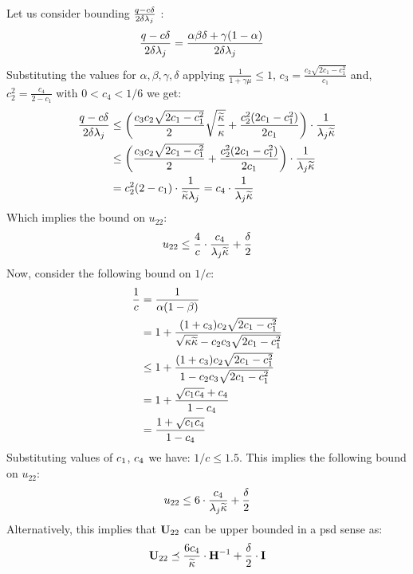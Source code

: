 Let us consider bounding $\frac{q -c\delta}{2\delta\lambda_j}$ :
\begin{align*}
\frac{q -c\delta}{2\delta\lambda_j}&=\frac{\alpha\beta\delta+\gamma(1-\alpha)}{2\delta\lambda_j}
\end{align*}
Substituting the values for $\alpha,\beta,\gamma,\delta$ applying $\frac{1}{1+\gamma\mu}\leq 1$, $c_3=\frac{c_2\sqrt{2c_1-c_1^2}}{c_1}$ and, $c_2^2=\frac{c_4}{2-c_1}$ with $0<c_4<1/6$ we get:
\begin{align*}
\frac{q -c\delta}{2\delta\lambda_j}&\leq\bigg( \frac{c_3c_2\sqrt{2c_1-c_1^2}}{2}\sqrt{\frac{\widetilde{\kappa}}{{\kappa}}} + \frac{c_2^2(2c_1-c_1^2)}{2c_1} \bigg)\cdot\frac{1}{\lambda_j\widetilde{\kappa}}\nonumber\\
&\leq\bigg( \frac{c_3c_2\sqrt{2c_1-c_1^2}}{2} + \frac{c_2^2(2c_1-c_1^2)}{2c_1} \bigg)\cdot\frac{1}{\lambda_j\widetilde{\kappa}}\nonumber\\
&=c_2^2(2-c_1)\cdot\frac{1}{\widetilde{\kappa}\lambda_j}=c_4\cdot\frac{1}{\lambda_j\widetilde{\kappa}}
\end{align*}
Which implies the bound on $u_{22}$:
\begin{align*}
u_{22}\leq\frac{4}{c}\cdot\frac{c_4}{\lambda_j\widetilde{\kappa}}+\frac{\delta}{2}
\end{align*}
Now, consider the following bound on $1/c$:
\begin{align}
\label{eq:oneOverc}
\frac{1}{c}&=\frac{1}{\alpha(1-\beta)}\nonumber\\
&=1+\frac{(1+c_3)c_2\sqrt{2c_1-c_1^2}}{\sqrt{{\kappa}\widetilde{\kappa}}-c_2c_3\sqrt{2c_1-c_1^2}}\nonumber\\
&\leq1+\frac{(1+c_3)c_2\sqrt{2c_1-c_1^2}}{1-c_2c_3\sqrt{2c_1-c_1^2}}\nonumber\\
&=1+\frac{\sqrt{c_1c_4}+c_4}{1-c_4}\nonumber\\
&=\frac{1+\sqrt{c_1c_4}}{1-c_4}
\end{align}
Substituting values of $c_1$, $c_4$ we have: $1/c\leq1.5$. This implies the following bound on $u_{22}$:
\begin{align}
\label{eq:u22b}
u_{22}\leq6\cdot\frac{c_4}{\lambda_j\widetilde{\kappa}}+\frac{\delta}{2}
\end{align}
Alternatively, this implies that $\mathbf{U}_{22}$ can be upper bounded in a psd sense as:
\begin{align*}
\mathbf{U}_{22}\preceq \frac{6 c_4}{\widetilde{\kappa}}\cdot{\mathbf{H}}^{-1} + \frac{\delta}{2}\cdot\mathbf{I}
\end{align*}
